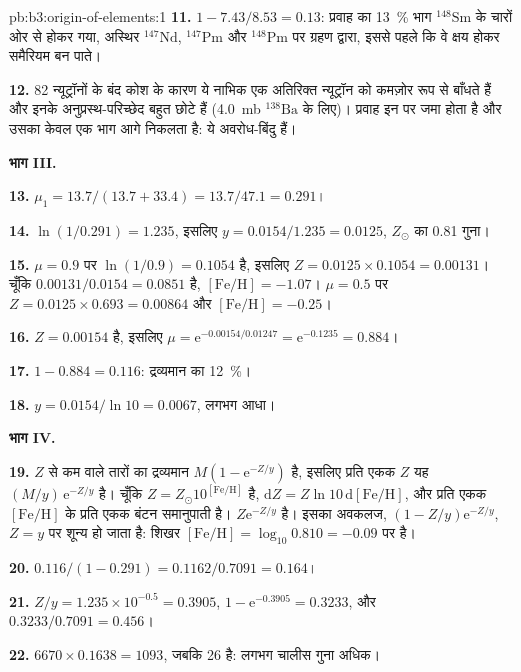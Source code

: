 \begin{solution}{pb:b3:origin-of-elements:1}
\textbf{11.} $1 - 7.43/8.53 = \num{0.13}$: प्रवाह का \qty{13}{\percent} भाग
$^{148}\mathrm{Sm}$ के चारों ओर से होकर गया, अस्थिर
$^{147}\mathrm{Nd}$, $^{147}\mathrm{Pm}$ और $^{148}\mathrm{Pm}$ पर ग्रहण द्वारा, इससे पहले कि
वे क्षय होकर समैरियम बन पाते।

\textbf{12.} 82 न्यूट्रॉनों के बंद कोश के कारण ये नाभिक एक अतिरिक्त
न्यूट्रॉन को कमज़ोर रूप से बाँधते हैं और इनके  अनुप्रस्थ-परिच्छेद बहुत छोटे हैं (\qty{4.0}{mb}
$^{138}\mathrm{Ba}$ के लिए)। प्रवाह इन पर जमा होता है और उसका केवल एक भाग
आगे निकलता है: ये अवरोध-बिंदु हैं।

\textbf{भाग III.}

\textbf{13.} $\mu_1 = 13.7/(13.7 + 33.4) = 13.7/47.1 = \num{0.291}$।

\textbf{14.} $\ln(1/0.291) = \num{1.235}$, इसलिए $y = 0.0154/1.235 = \num{0.0125}$,
$Z_\odot$ का \num{0.81} गुना।

\textbf{15.} $\mu = 0.9$ पर $\ln(1/0.9) = 0.1054$ है, इसलिए $Z = 0.0125\times0.1054 =
\num{0.00131}$। चूँकि $0.00131/0.0154 = 0.0851$ है, $[\mathrm{Fe/H}] =
-1.07$। $\mu = 0.5$ पर $Z = 0.0125\times0.693 = \num{0.00864}$ और
$[\mathrm{Fe/H}] = -0.25$।

\textbf{16.} $Z = 0.00154$ है, इसलिए $\mu = \mathrm{e}^{-0.00154/0.01247} =
\mathrm{e}^{-0.1235} = \num{0.884}$।

\textbf{17.} $1 - 0.884 = \num{0.116}$: द्रव्यमान का \qty{12}{\percent}।

\textbf{18.} $y = 0.0154/\ln 10 = \num{0.0067}$, लगभग आधा।

\textbf{भाग IV.}

\textbf{19.} $Z$ से कम  वाले तारों का द्रव्यमान
$M(1 - \mathrm{e}^{-Z/y})$ है, इसलिए प्रति एकक $Z$ यह
$(M/y)\,\mathrm{e}^{-Z/y}$ है। चूँकि $Z = Z_\odot10^{[\mathrm{Fe/H}]}$ है,
$\mathrm{d}Z = Z\ln 10\,\mathrm{d}[\mathrm{Fe/H}]$, और प्रति एकक
$[\mathrm{Fe/H}]$ के प्रति एकक बंटन समानुपाती है।
$Z\mathrm{e}^{-Z/y}$ है। इसका अवकलज,
$(1 - Z/y)\mathrm{e}^{-Z/y}$, $Z = y$ पर शून्य हो जाता है: शिखर
$[\mathrm{Fe/H}] = \log_{10}0.810 = -0.09$ पर है।

\textbf{20.} $\num{0.116}/(1 - 0.291) = 0.1162/0.7091 = \num{0.164}$।

\textbf{21.} $Z/y = 1.235\times10^{-0.5} = 0.3905$, $1 - \mathrm{e}^{-0.3905} =
0.3233$, और $0.3233/0.7091 = \num{0.456}$।

\textbf{22.} $6670\times0.1638 = 1093$, जबकि 26 है: लगभग चालीस गुना अधिक।


\end{solution}
